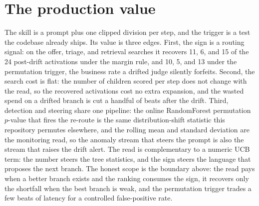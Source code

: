\documentclass[11pt,a4paper]{article}
\begin{document}
\section{The production value}
The skill is a prompt plus one clipped division per step, and the trigger is a test the codebase already ships.
Its value is three edges.
First, the sign is a routing signal: on the offer, triage, and retrieval searches it recovers 11, 6, and 15 of the 24 post-drift activations under the margin rule, and 10, 5, and 13 under the permutation trigger, the business rate a drifted judge silently forfeits.
Second, the search cost is flat: the number of children scored per step does not change with the read, so the recovered activations cost no extra expansion, and the wasted spend on a drifted branch is cut a handful of beats after the drift.
Third, detection and steering share one pipeline: the online RandomForest permutation \(p\)-value that fires the re-route is the same distribution-shift statistic this repository permutes elsewhere, and the rolling mean and standard deviation are the monitoring read, so the anomaly stream that steers the prompt is also the stream that raises the drift alert.
The read is complementary to a numeric UCB term: the number steers the tree statistics, and the sign steers the language that proposes the next branch.
The honest scope is the boundary above: the read pays when a better branch exists and the ranking consumes the sign, it recovers only the shortfall when the best branch is weak, and the permutation trigger trades a few beats of latency for a controlled false-positive rate.
\end{document}
